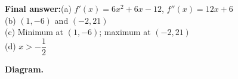 \documentclass[11pt]{article}
\begin{document}
\begin{answerbox}
\textbf{Final answer:}\quad (a) \(\displaystyle  f'(x) = 6x^2+6x-12 \), \(\displaystyle  f''(x) = 12x+6 \) \\[3pt]  (b) \(\displaystyle  (1,-6) \) and \(\displaystyle  (-2,21) \) \\[3pt]  (c) Minimum at \(\displaystyle  (1,-6) \); maximum at \(\displaystyle  (-2,21) \) \\[3pt]  (d) \(\displaystyle  x > -\dfrac{1}{2} \)
\end{answerbox}
\textbf{Diagram.}

\begin{center}
\end{center}
\end{document}
